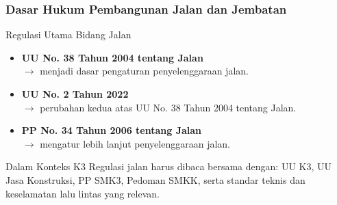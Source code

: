 \documentclass[../main.tex]{subfiles}
\begin{document}
\begin{frame}[mytitle=standard,c,mycolor=digiPH_yellow!15]
	\frametitle{Dasar Hukum Pembangunan Jalan dan Jembatan}

	\begin{block}{Regulasi Utama Bidang Jalan}
		\begin{itemize}
			\item \textbf{UU No. 38 Tahun 2004 tentang Jalan}\\
			      $\rightarrow$ menjadi dasar pengaturan penyelenggaraan jalan.
			\item \textbf{UU No. 2 Tahun 2022}\\
			      $\rightarrow$ perubahan kedua atas UU No. 38 Tahun 2004 tentang Jalan.
			\item \textbf{PP No. 34 Tahun 2006 tentang Jalan}\\
			      $\rightarrow$ mengatur lebih lanjut penyelenggaraan jalan.
		\end{itemize}
	\end{block}

	\begin{alertblock}{Dalam Konteks K3}
		Regulasi jalan harus dibaca bersama dengan: UU K3, UU Jasa Konstruksi, PP SMK3, Pedoman SMKK, serta standar teknis dan keselamatan lalu lintas yang relevan.
	\end{alertblock}
\end{frame}
\end{document}
